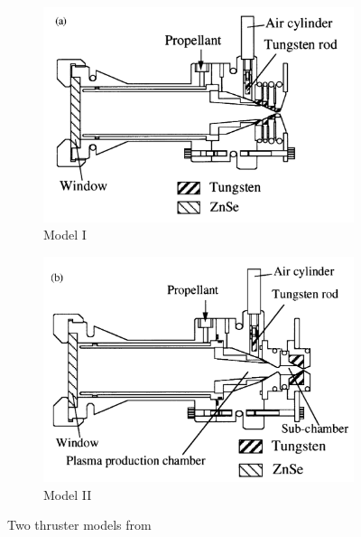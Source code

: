         \begin{figure}[h!]
            \centering
            \begin{subfigure}[t]{0.45\textwidth}
                \centering
                \includegraphics[width=\textwidth]{assets/2 background/Toyoda apparatus model 1.jpg}
                \caption{Model I}
                \label{fig:Toyoda apparatus 1}
            \end{subfigure}
            \hfill
            \begin{subfigure}[t]{0.45\textwidth}
                \centering
                \includegraphics[width=\textwidth]{assets/2 background/Toyoda Apparatus model 2.png}
                \caption{Model II}
                \label{fig:Toyoda apparatus 2}
            \end{subfigure}
            \caption{Two thruster models from \textcite{toyodaThrustPerformanceCW2002}}
            \label{fig:Toyoda apparatussies}
        \end{figure}

